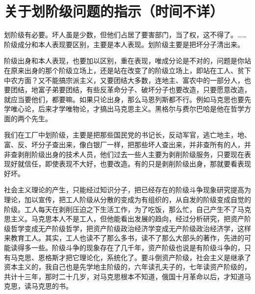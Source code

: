 \section[关于划阶级问题的指示（时间不详）]{关于划阶级问题的指示（时间不详）}


划阶级有必要。坏人虽是少数，但他们占居了要害部门，当了权，这不得了。……阶级成分和本人表现要区别，主要是本人表现。划阶级主要是把坏分子清出来。

阶级出身和本人表现，也要加以区别，重在表现，唯成分论是不对的，问题是你站在原来出身的那个阶级立场上，还是站在改变了的阶级立场上，即站在工人、贫下中农方面？又不能搞宗派主义，又要团结大多数，连地主、富农中的一部分人，也要团结，地富子弟要团结，有些反革命分子、破坏分子也要改造，只要愿意改造，就应当要他们，都要嘛。如果只论出身，那么马恩列斯都不行。例如马克思也要先学唯心论，后来才学唯物论，才搞出马克思主义。黑格尔与费尔巴哈是他在哲学方面的两个先生。

我们在工厂中划阶级，主要是把那些国民党的书记长，反动军官，逃亡地主，地、富、反、坏分子查出来，像白银厂一样，把那些坏人查出来，并非查所有的人，并非查剥削阶级出身的技术人员，他们过去一些人主要为剥削阶级服务，只要现在表现好就信任，即使表现不大好，也要改造。有的只是剥削阶级出身，那就要看表现好坏。

社会主义理论的产生，只能经过知识分子，把已经存在的阶级斗争现象研究提高为理论，加以宣传，把工人阶级从分散的变成为有组织的，从自发的阶级变成自觉的阶级。工人每天在剥削压迫之下生活工作，为了吃饭，那么忙，自己产生不了马克思主义。马克思本人不是工人，但他能看出发展的趋向，经过分析研究，把资产阶级哲学变成无产阶级哲学，把资产阶级政治经济学变成无产阶级政治经济学，这样来教育工人。其实，工人也读不了那么多书，读不了那么大部头的著作，先进的可能读得多一些。阶级斗争的现象存在了几千年，资产阶级也说是有阶级斗争的，只有马克思、恩格斯才把它理论化，系统化了。要斗倒资产阶级，社会主义是继承了资本主义的，我自己也是先学地主阶级的，六年读孔夫子的，七年读资产阶级的，共计十三年，那时二十几岁，对马克思根本不知道，俄国十月革命以后，才知道马克思，读马克思的书。


